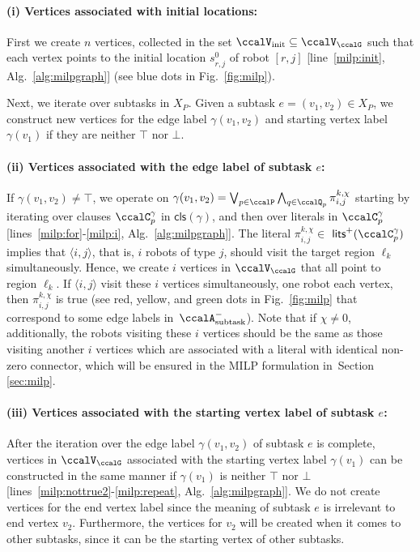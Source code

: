 \documentclass[Afour,sageh,times]{sagej}
\newcommand{\clause}[1]{\mathsf{cls}(#1)}
\newcommand{\auto}[1]{\ccalA_{\textup{#1}}}
\newcommand{\ag}[2]{\langle#1,#2\rangle}
\renewcommand{\ap}[3]{\mathcal{\pi}_{{#1},{#2}}^{#3}}
\begin{document}
\paragraph{(i) Vertices associated with initial locations:} First we create $n$ vertices, collected in the set $\ccalV_{\text{init}}\subseteq \ccalV_{\ccalG}$ such that each vertex points to the initial location $s^0_{r,j}$ of robot $[r,j]$ [line~\ref{milp:init}, Alg.~\ref{alg:milpgraph}] (see blue dots in Fig.~\ref{fig:milp}).

Next, we iterate over subtasks in $X_{P}$. Given a subtask $e = (v_1, v_2) \in X_{P}$, we construct new vertices for the  edge label $\gamma(v_1, v_2)$ and starting vertex label $\gamma(v_1)$ if they are neither $\top$ nor $\bot$.

\paragraph{(ii) Vertices associated with the edge label of subtask $e$:} If $\gamma(v_1, v_2) \not= \top$, we operate on $\gamma(v_1, v_2) =  \bigvee_{p\in \ccalP} \bigwedge_{q \in \ccalQ_{p}} \ap{i}{j}{k,\chi}$ starting by iterating over clauses $\ccalC_p^{\gamma}$ in $\clause{\gamma}$, and then over literals in $\ccalC_p^\gamma$ [lines~\ref{milp:for}-\ref{milp:i}, Alg.~\ref{alg:milpgraph}].
The literal $\ap{i}{j}{k,\chi}\in $ $\mathsf{lits}^+(\ccalC_p^{\gamma})$ implies that $\ag{i}{j}$, that is, $i$ robots of type $j$,  should visit the target region $\ell_k$ simultaneously. Hence, we create $i$ vertices in $\ccalV_\ccalG$  that all point to region $\ell_k$. If $\ag{i}{j}$ visit these $i$ vertices simultaneously, one robot each vertex, then $\ap{i}{j}{k,\chi}$ is true (see red, yellow, and green dots in Fig.~\ref{fig:milp} that correspond to some edge labels in~$\auto{subtask}^-$). Note that if $\chi\not=0$, additionally, the robots visiting these $i$ vertices should be the same as those visiting another $i$ vertices which are associated with a literal with identical non-zero connector, which will be ensured in the MILP formulation in~Section \ref{sec:milp}.

\paragraph{(iii) Vertices associated with the starting vertex label of subtask $e$:} After the iteration over the edge label $\gamma(v_1, v_2)$ of subtask $e$ is complete, vertices in $\ccalV_\ccalG$ associated with the starting  vertex label $\gamma(v_1)$ can be constructed in the same manner if $\gamma(v_1)$ is neither $\top$ nor $\bot$ [lines~\ref{milp:nottrue2}-\ref{milp:repeat}, Alg.~\ref{alg:milpgraph}]. We do not create vertices for the end vertex label since the meaning of subtask $e$ is irrelevant to end vertex $v_2$. Furthermore, the vertices for $v_2$ will be created when it comes to other subtasks, since it can be the starting vertex of other subtasks.
\end{document}
